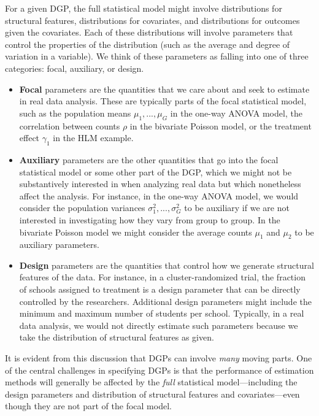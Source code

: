 \documentclass[
]{book}
\begin{document}
For a given DGP, the full statistical model might involve distributions for structural features, distributions for covariates, and distributions for outcomes given the covariates.
Each of these distributions will involve parameters that control the properties of the distribution (such as the average and degree of variation in a variable).
We think of these parameters as falling into one of three categories: focal, auxiliary, or design.

\begin{itemize}
\item
  \textbf{Focal} parameters are the quantities that we care about and seek to estimate in real data analysis.
  These are typically parts of the focal statistical model, such as the population means \(\mu_1,...,\mu_G\) in the one-way ANOVA model, the correlation between counts \(\rho\) in the bivariate Poisson model, or the treatment effect \(\gamma_{1}\) in the HLM example.
\item
  \textbf{Auxiliary} parameters are the other quantities that go into the focal statistical model or some other part of the DGP, which we might not be substantively interested in when analyzing real data but which nonetheless affect the analysis.
  For instance, in the one-way ANOVA model, we would consider the population variances \(\sigma_1^2,...,\sigma_G^2\) to be auxiliary if we are not interested in investigating how they vary from group to group.
  In the bivariate Poisson model we might consider the average counts \(\mu_1\) and \(\mu_2\) to be auxiliary parameters.
\item
  \textbf{Design} parameters are the quantities that control how we generate structural features of the data.
  For instance, in a cluster-randomized trial, the fraction of schools assigned to treatment is a design parameter that can be directly controlled by the researchers.
  Additional design parameters might include the minimum and maximum number of students per school.
  Typically, in a real data analysis, we would not directly estimate such parameters because we take the distribution of structural features as given.
\end{itemize}

It is evident from this discussion that DGPs can involve \emph{many} moving parts.
One of the central challenges in specifying DGPs is that the performance of estimation methods will generally be affected by the \emph{full} statistical model---including the design parameters and distribution of structural features and covariates---even though they are not part of the focal model.
\end{document}
